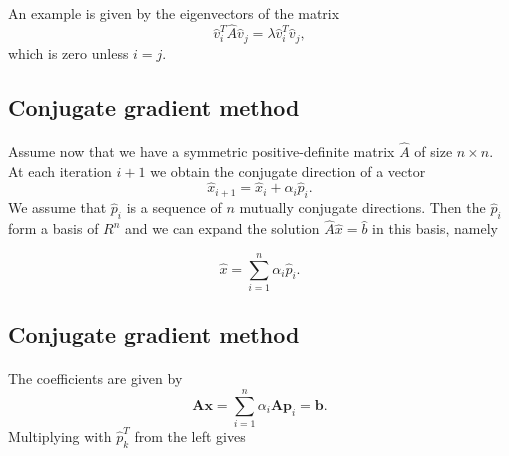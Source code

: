 \documentclass[%
oneside,                 %
final,                   %
10pt]{article}
\begin{document}
\paragraph{}
An example is given by the eigenvectors of the matrix
\begin{equation*}
\hat{v}_i^T\hat{A}\hat{v}_j= \lambda\hat{v}_i^T\hat{v}_j,
\end{equation*}
which is zero unless $i=j$.



\subsection*{Conjugate gradient method}

\paragraph{}
Assume now that we have a symmetric positive-definite matrix $\hat{A}$ of size
$n\times n$. At each iteration $i+1$ we obtain the conjugate direction of a vector
\begin{equation*}
\hat{x}_{i+1}=\hat{x}_{i}+\alpha_i\hat{p}_{i}. 
\end{equation*}
We assume that $\hat{p}_{i}$ is a sequence of $n$ mutually conjugate directions. 
Then the $\hat{p}_{i}$  form a basis of $R^n$ and we can expand the solution 
$  \hat{A}\hat{x} = \hat{b}$ in this basis, namely

\begin{equation*}
  \hat{x}  = \sum^{n}_{i=1} \alpha_i \hat{p}_i.
\end{equation*}



\subsection*{Conjugate gradient method}

\paragraph{}
The coefficients are given by
\begin{equation*}
    \mathbf{A}\mathbf{x} = \sum^{n}_{i=1} \alpha_i \mathbf{A} \mathbf{p}_i = \mathbf{b}.
\end{equation*}
Multiplying with $\hat{p}_k^T$  from the left gives
\end{document}
